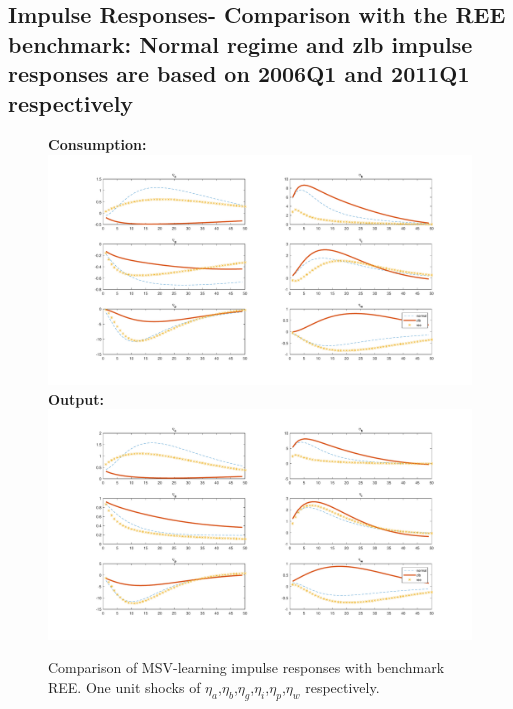 \documentclass[12pt,reqno]{article}
\numberwithin{equation}{section}
\begin{document}
\subsection*{Impulse Responses- Comparison with the REE benchmark: Normal regime and zlb impulse responses are based on 2006Q1 and 2011Q1 respectively}


\begin{figure}[H]
\caption{Comparison of MSV-learning impulse responses with benchmark REE. One unit shocks of $\eta_a$,$\eta_b$,$\eta_g$,$\eta_i$,$\eta_p$,$\eta_w$ respectively.}
\textbf{Consumption:}\\
\includegraphics[scale=0.5]{MSV_impresp_cons_reeComp.pdf}
\textbf{Output:}\\
\includegraphics[scale=0.5]{MSV_impresp_output_reeComp.pdf}
\end{figure}
\end{document}
